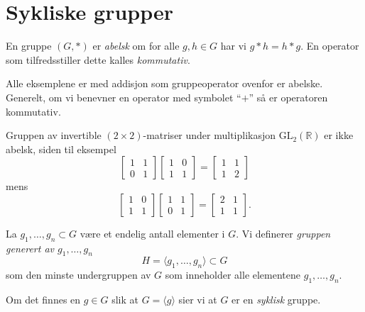 \section{Sykliske grupper}

\begin{definition}
    En gruppe $(G, \ast)$ er \textit{abelsk} om
    for alle $g,h\in G$ har vi $g\ast h = h\ast g$.
    En operator som tilfredsstiller dette kalles \textit{kommutativ}.
\end{definition}

\begin{example}
    Alle eksemplene er med addisjon som gruppeoperator ovenfor er abelske.
    Generelt, om vi benevner en operator med symbolet ``$+$'' så er operatoren
    kommutativ.
\end{example}

\begin{example}
    Gruppen av invertible $(2\times 2)$-matriser under multiplikasjon
    $\mathrm{GL}_2(\mathbb R)$
    er ikke abelsk, siden til eksempel
    \[
        \begin{bmatrix}
            1 & 1\\
            0 & 1
        \end{bmatrix}
        \begin{bmatrix}
            1 & 0\\
            1 & 1
        \end{bmatrix}
        =
        \begin{bmatrix}
            1 & 1\\
            1 & 2
        \end{bmatrix}
    \]
    mens
    \[
        \begin{bmatrix}
            1 & 0\\
            1 & 1
        \end{bmatrix}
        \begin{bmatrix}
            1 & 1\\
            0 & 1
        \end{bmatrix}
        =
        \begin{bmatrix}
            2 & 1\\
            1 & 1
        \end{bmatrix}.
    \]
\end{example}

\begin{definition}
    La $g_1,\dots, g_n\subset G$ være et endelig antall elementer i $G$.
    Vi definerer \textit{gruppen generert av $g_1,\dots, g_n$}
    \[
        H = \langle g_1,\dots,g_n\rangle \subset G
    \]
    som den minste undergruppen av $G$ som inneholder alle elementene $g_1,\dots,g_n$.

    Om det finnes en $g\in G$ slik at $G = \langle g\rangle$ sier vi at $G$
    er en \textit{syklisk} gruppe.
\end{definition}

